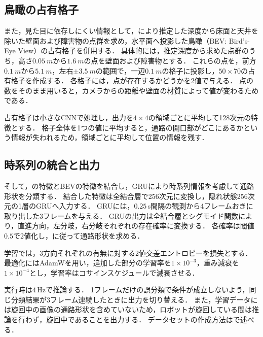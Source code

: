 \subsection{鳥瞰の占有格子}

また，見た目に依存しにくい情報として，\UniDepth により推定した深度から床面と天井を除いた壁面および障害物の点群を求め，水平面へ投影した鳥瞰（BEV: Bird's-Eye View）の占有格子を併用する．
具体的には，推定深度から求めた点群のうち，高さ$\SI{0.05}{m}$から$\SI{1.6}{m}$の点を壁面および障害物とする．
これらの点を，前方$\SI{0.1}{m}$から$\SI{5.1}{m}$，左右$\pm\SI{3.5}{m}$の範囲で，一辺$\SI{0.1}{m}$の格子に投影し，$50\times70$の占有格子を作成する．
各格子には，点が存在するかどうかを2値で与える．
点の数をそのまま用いると，カメラからの距離や壁面の材質によって値が変わるためである．

占有格子は小さなCNNで処理し，出力を$4\times4$の領域ごとに平均して128次元の特徴とする．
格子全体を1つの値に平均すると，通路の開口部がどこにあるかという情報が失われるため，領域ごとに平均して位置の情報を残す．

\subsection{時系列の統合と出力}

そして，\DINOvTwo の特徴とBEVの特徴を結合し，GRU\cite{gru}により時系列情報を考慮して通路形状を分類する．
結合した特徴は全結合層で256次元に変換し，隠れ状態256次元の1層のGRUへ入力する．
GRUには，$0.25$\,s間隔の観測から4フレームおきに取り出した3フレームを与える．
GRUの出力は全結合層とシグモイド関数により，直進方向，左分岐，右分岐それぞれの存在確率に変換する．
各確率は閾値$0.5$で2値化し，に従って通路形状を求める．

学習では，3方向それぞれの有無に対する2値交差エントロピーを損失とする．
最適化にはAdamW\cite{adamw}を用い，追加した部分の学習率を$1\times10^{-3}$，重み減衰を$1\times10^{-4}$とし，学習率はコサインスケジュールで減衰させる．

実行時は$4$\,Hzで推論する．
1フレームだけの誤分類で条件が成立しないよう，同じ分類結果が3フレーム連続したときに出力を切り替える．
また，学習データには旋回中の画像の通路形状を含めていないため，ロボットが旋回している間は推論を行わず，旋回中であることを出力する．
データセットの作成方法はで述べる．

